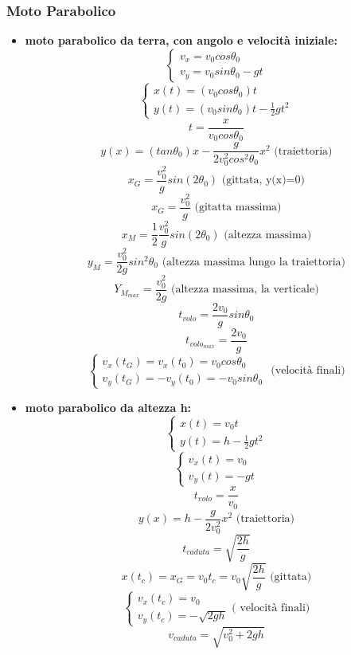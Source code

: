 \documentclass[a4paper,12pt, oneside]{book}
\begin{document}
\subsubsection{Moto Parabolico}
\begin{itemize}
	\item \textbf{moto parabolico da terra, con angolo e velocità iniziale:}
	      $$
		      \begin{cases}
			      v_x=v_0cos\theta_0 \\
			      v_y=v_0sin\theta_0-gt
		      \end{cases}
	      $$
	      $$\begin{cases}
			      x(t)=(v_0cos\theta_0)t \\
			      y(t)=(v_0sin\theta_0)t-\frac{1}{2}gt^2
		      \end{cases}$$
	      $$t=\frac{x}{v_0cos\theta_0}$$
	      $$y(x)=(tan\theta_0)x-\frac{g}{2v_0^2cos^2\theta_0}x^2\mbox{ (traiettoria)}$$
	      $$x_G=\frac{v_0^2}{g}sin(2\theta_0)\mbox{ (gittata, y(x)=0)}$$
	      $$x_G=\frac{v_0^2}{g}\mbox{ (gitatta massima)}$$
	      $$x_M=\frac{1}{2}\frac{v_0^2}{g}sin(2\theta_0)\mbox{ (altezza massima)}$$
	      $$y_M=\frac{v_0^2}{2g}sin^2\theta_0 \mbox{ (altezza massima lungo la traiettoria)}$$
	      $$Y_{M_{max}}=\frac{v_0^2}{2g}\mbox{ (altezza massima, la verticale)}$$
	      $$t_{volo}=\frac{2v_0}{g}sin\theta_0$$
	      $$t_{{volo}_{max}}=\frac{2v_0}{g}$$
	      $$\begin{cases}
			      v_x(t_G)=v_x(t_0)=v_0cos\theta_0 \\
			      v_y(t_G)=-v_y(t_0)=-v_0sin\theta_0
		      \end{cases}\mbox{ (velocità finali)}$$
	\item \textbf{moto parabolico da altezza h:}
	      $$\begin{cases}
			      x(t)=v_0t \\
			      y(t)=h-\frac{1}{2}gt^2
		      \end{cases}$$
	      $$\begin{cases}
			      v_x(t)=v_0 \\
			      v_y(t)=-gt
		      \end{cases}$$
	      $$t_{volo}=\frac{x}{v_0}$$
	      $$y(x)=h-\frac{g}{2v_0^2}x^2\mbox{ (traiettoria)}$$
	      $$t_{caduta}=\sqrt{\frac{2h}{g}}$$
	      $$x(t_c)=x_G=v_0t_c=v_0\sqrt{\frac{2h}{g}}\mbox{ (gittata)}$$
	      $$\begin{cases}v_x(t_c)=v_0 \\
			      v_y(t_c)=-\sqrt{2gh}\end{cases} \mbox{( velocità finali)}$$
	      $$v_{caduta}=\sqrt{v_0^2+2gh}$$
\end{itemize}
\end{document}
